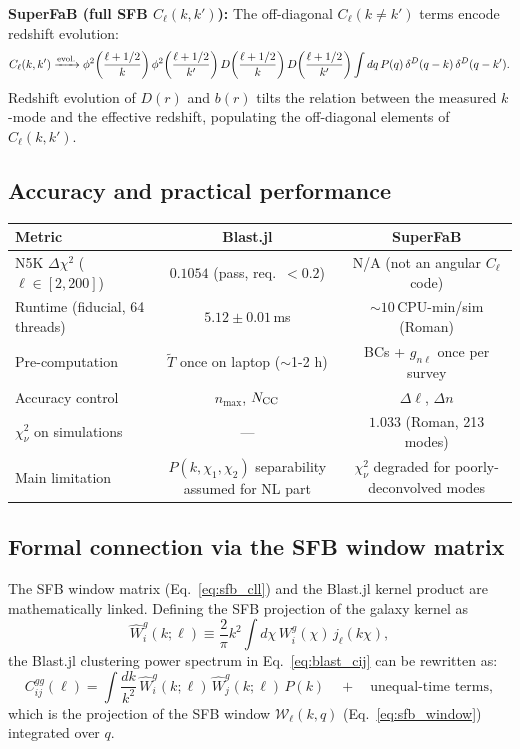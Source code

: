 \textbf{SuperFaB (full SFB $C_\ell(k,k')$):}
The off-diagonal $C_\ell(k\ne k')$ terms encode redshift evolution:
\begin{equation}
    C_\ell(k,k') \xrightarrow{{\rm evol.}}
    \phi^2\!\left(\frac{\ell+1/2}{k}\right)
    \phi^2\!\left(\frac{\ell+1/2}{k'}\right)
    D\!\left(\frac{\ell+1/2}{k}\right)
    D\!\left(\frac{\ell+1/2}{k'}\right)
    \int dq\,P(q)\,\delta^D(q-k)\,\delta^D(q-k').
\end{equation}
Redshift evolution of $D(r)$ and $b(r)$ tilts the relation between
the measured $k$-mode and the effective redshift, populating the
off-diagonal elements of $C_\ell(k,k')$.

\subsection{Accuracy and practical performance}

\begin{center}
\renewcommand{\arraystretch}{1.5}
\begin{tabular}{lcc}
\toprule
\textbf{Metric} & \textbf{Blast.jl} & \textbf{SuperFaB} \\
\midrule
N5K $\Delta\chi^2$ ($\ell\in[2,200]$) & $0.1054$ (pass, req.\ $<0.2$) &
    N/A (not an angular $C_\ell$ code) \\
Runtime (fiducial, 64 threads) & $5.12 \pm 0.01$\,ms &
    $\sim10$\,CPU-min/sim (Roman) \\
Pre-computation & $\tilde{T}$ once on laptop ($\sim$1-2 h) &
    BCs + $g_{n\ell}$ once per survey \\
Accuracy control & $n_{\max}$, $N_{\rm CC}$ & $\Delta\ell$, $\Delta n$ \\
$\chi^2_\nu$ on simulations & --- & $1.033$ (Roman, 213 modes) \\
Main limitation & $P(k,\chi_1,\chi_2)$ separability assumed
    for NL part & $\chi^2_\nu$ degraded for poorly-deconvolved modes \\
\bottomrule
\end{tabular}
\end{center}

\subsection{Formal connection via the SFB window matrix}

The SFB window matrix (Eq.~\eqref{eq:sfb_cll}) and the Blast.jl
kernel product are mathematically linked. Defining the SFB projection
of the galaxy kernel as
\begin{equation}
    \hat{W}_i^g(k;\ell) \equiv
    \frac{2}{\pi}k^2
    \int d\chi\,W_i^g(\chi)\,j_\ell(k\chi),
\end{equation}
the Blast.jl clustering power spectrum in Eq.~\eqref{eq:blast_cij} can
be rewritten as:
\begin{equation}
    C_{ij}^{gg}(\ell) =
    \int \frac{dk}{k^2}\,
    \hat{W}_i^g(k;\ell)\,
    \hat{W}_j^g(k;\ell)\,
    P(k)
    \quad + \quad \text{unequal-time terms},
\end{equation}
which is the projection of the SFB window $\mathcal{W}_\ell(k,q)$
(Eq.~\eqref{eq:sfb_window}) integrated over $q$.

